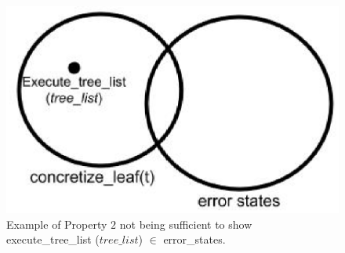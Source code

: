 \begin{figure}
\label{fig:Prop2}
\includegraphics[width=\textwidth]{prop2.eps}
\caption{Example of Property $2$ not being sufficient to show execute\_tree\_list ($tree\_list$) $\in$ error\_states.}
\end{figure}




